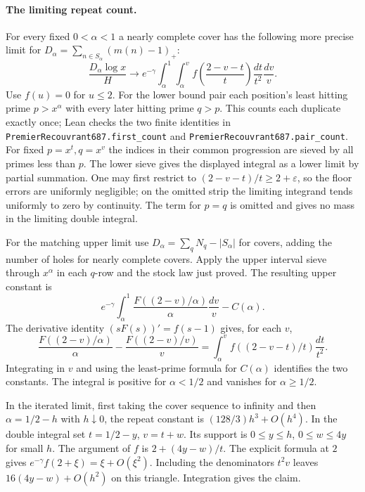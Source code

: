 \documentclass[11pt]{article}
\begin{document}
\paragraph{The limiting repeat count.}
For every fixed $0<\alpha<1$ a nearly complete cover has the following
more precise limit for $D_\alpha=\sum_{n\in S_\alpha}(m(n)-1)_+$:
\[
 \frac{D_\alpha\log x}{H}\longrightarrow
 e^{-\gamma}\int_\alpha^1\!\int_\alpha^v
       f\!\left(\frac{2-v-t}{t}\right)\frac{dt}{t^2}\frac{dv}{v}.
\]
Use $f(u)=0$ for $u\le2$. For the lower bound pair each position's
least hitting prime $p>x^\alpha$ with every later hitting prime
$q>p$. This counts each duplicate exactly once; Lean checks the two
finite identities in \texttt{PremierRecouvrant687.first\_count} and
\texttt{PremierRecouvrant687.pair\_count}. For fixed
$p=x^t,q=x^v$ the indices in their common progression are sieved
by all primes less than $p$. The lower sieve gives the displayed
integral as a lower limit by partial summation. One may first restrict
to $(2-v-t)/t\ge2+\varepsilon$, so the floor errors are uniformly
negligible; on the omitted strip the limiting integrand tends
uniformly to zero by continuity. The term for $p=q$ is omitted
and gives no mass in the limiting double integral.

For the matching upper limit use $D_\alpha=\sum_q N_q-|S_\alpha|$
for covers, adding the number of holes for nearly complete covers.
Apply the upper interval sieve through $x^\alpha$ in each $q$-row
and the stock law just proved. The resulting upper constant is
\[
 e^{-\gamma}\int_\alpha^1 \frac{F((2-v)/\alpha)}{\alpha}\frac{dv}{v}
     - C(\alpha).
\]
The derivative identity $(sF(s))'=f(s-1)$ gives, for each $v$,
\[
 \frac{F((2-v)/\alpha)}{\alpha}-\frac{F((2-v)/v)}v
     =\int_\alpha^v f((2-v-t)/t)\frac{dt}{t^2}.
\]
Integrating in $v$ and using the least-prime formula for $C(\alpha)$
identifies the two constants. The integral is positive for
$\alpha<1/2$ and vanishes for $\alpha\ge1/2$.

In the iterated limit, first taking the cover sequence to infinity and
then $\alpha=1/2-h$ with $h\downarrow0$, the repeat constant is
$(128/3)h^3+O(h^4)$. In the double integral set $t=1/2-y$, $v=t+w$.
Its support is $0\le y\le h$, $0\le w\le4y$ for small $h$. The argument
of $f$ is $2+(4y-w)/t$. The explicit formula at $2$ gives
$e^{-\gamma}f(2+\xi)=\xi+O(\xi^2)$. Including the denominators $t^2v$
leaves $16(4y-w)+O(h^2)$ on this triangle. Integration gives the claim.
\end{document}

